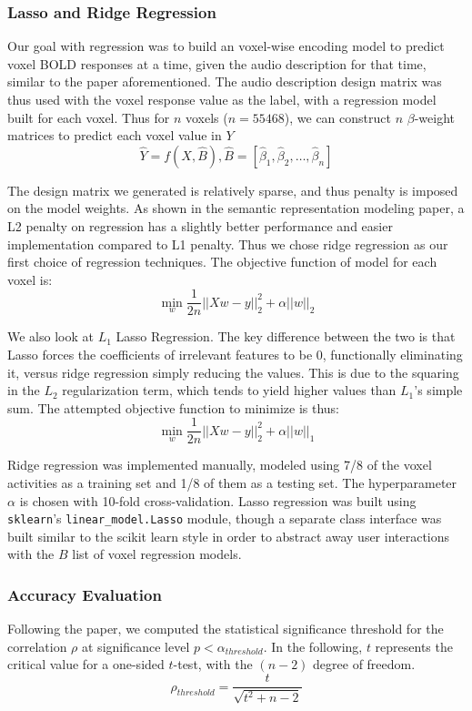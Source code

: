 \subsubsection{Lasso and Ridge Regression}
\par Our goal with regression was to build an voxel-wise encoding model to predict voxel BOLD responses at a time, given the audio description for that time, similar to the paper aforementioned. The audio description design matrix was thus used with the voxel response value as the label, with a regression model built for each voxel. Thus for $n$ voxels ($n=55468$), we can construct $n$ $\beta$-weight matrices to predict each voxel value in $Y$
$$ \hat{Y} = f(X, \hat{B}), \hat{B} = [\hat{\beta}_1, \hat{\beta}_2, \ldots, \hat{\beta}_n ] $$

\par The design matrix we generated is relatively sparse, and thus penalty is imposed on the model weights. As shown in the semantic representation modeling paper\cite{stansbury2013neuron}, a L2 penalty on regression has a slightly better performance and easier implementation compared to L1 penalty. Thus we chose ridge regression as our first choice of regression techniques. The objective function of model for each voxel is:
$$\min_{w} \frac{1}{2n} ||Xw - y||_2^2 +\alpha||w||_2$$ 

We also look at $L_1$ Lasso Regression. The key difference between the two is that Lasso forces the coefficients of irrelevant features to be 0, functionally eliminating it, versus ridge regression simply reducing the values. This is due to the squaring in the $L_2$ regularization term, which tends to yield higher values than $L_1$'s simple sum. The attempted objective function to minimize is thus:
$$\min_{w} \frac{1}{2n} ||Xw - y||_2^2 +\alpha||w||_1$$ 

\par Ridge regression was implemented manually, modeled using 7/8 of the voxel activities as a training set and 1/8 of them as a testing set. The hyperparameter $\alpha$ is chosen with 10-fold cross-validation. Lasso regression was built using \texttt{sklearn}'s \texttt{linear\_model.Lasso} module, though a separate class interface was built similar to the scikit learn style in order to abstract away user interactions with the $B$ list of voxel regression models.
\subsubsection*{Accuracy Evaluation}
Following the paper\cite{stansbury2013neuron}, we computed the statistical significance threshold for the correlation $\rho$ at significance level $p<\alpha_{threshold}$. In the following, $t$ represents the critical value for a one-sided $t$-test, with the $(n-2)$ degree of freedom.
$$\rho_{threshold} = \frac{t}{\sqrt{t^2+n-2}} $$

